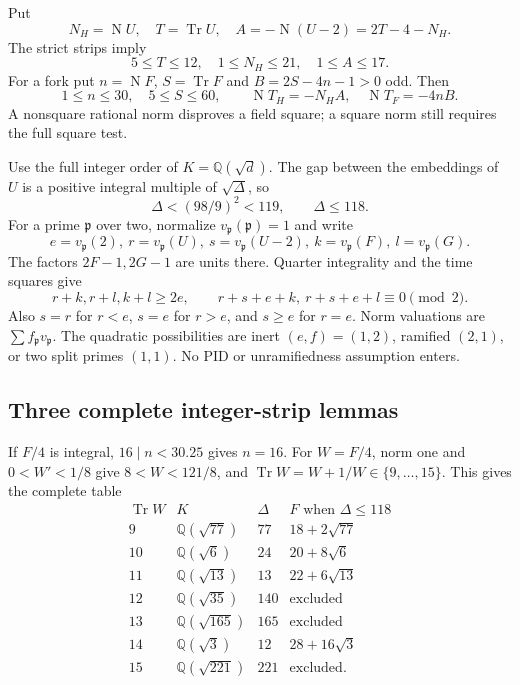 \documentclass[11pt]{article}
\newcommand{\QQ}{\mathbb Q}
\newcommand{\Tr}{\operatorname{Tr}}
\newcommand{\N}{\operatorname{N}}
\begin{document}
Put
\[
 N_H=\N U,\quad T=\Tr U,\quad A=-\N(U-2)=2T-4-N_H.
\]
The strict strips imply
\[
 5\le T\le12,\quad1\le N_H\le21,\quad1\le A\le17.
\]
For a fork put $n=\N F$, $S=\Tr F$ and
$B=2S-4n-1>0$ odd. Then
\begin{equation}\label{eq:tnorm}
 1\le n\le30,\quad5\le S\le60,\qquad
 \N T_H=-N_HA,\quad\N T_F=-4nB.
\end{equation}
A nonsquare rational norm disproves a field square; a square norm
still requires the full square test.

Use the full integer order of $K=\QQ(\sqrt d)$.
The gap between the embeddings of $U$ is a positive integral
multiple of $\sqrt\Delta$, so
\begin{equation}\label{eq:disc118}
 \Delta<(98/9)^2<119,\qquad\Delta\le118.
\end{equation}
For a prime $\mathfrak p$ over two, normalize
$v_{\mathfrak p}(\mathfrak p)=1$ and write
\[
 e=v_{\mathfrak p}(2),\ r=v_{\mathfrak p}(U),\
 s=v_{\mathfrak p}(U-2),\
 k=v_{\mathfrak p}(F),\ l=v_{\mathfrak p}(G).
\]
The factors $2F-1,2G-1$ are units there. Quarter integrality and
the time squares give
\begin{equation}\label{eq:valuation}
 r+k,r+l,k+l\ge2e,\qquad
 r+s+e+k,\ r+s+e+l\equiv0\pmod2.
\end{equation}
Also $s=r$ for $r<e$, $s=e$ for $r>e$, and $s\ge e$ for
$r=e$. Norm valuations are $\sum f_{\mathfrak p}v_{\mathfrak p}$.
The quadratic possibilities are inert $(e,f)=(1,2)$, ramified
$(2,1)$, or two split primes $(1,1)$. No PID or unramifiedness
assumption enters.

\subsection{Three complete integer-strip lemmas}

If $F/4$ is integral, $16\mid n<30.25$ gives $n=16$.
For $W=F/4$, norm one and $0<W'<1/8$ give
$8<W<121/8$, and $\Tr W=W+1/W\in\{9,\ldots,15\}$.
This gives the complete table
\[
\begin{array}{c|c|r|l}
\Tr W&K&\Delta&F\text{ when }\Delta\le118\\\hline
9&\QQ(\sqrt{77})&77&18+2\sqrt{77}\\
10&\QQ(\sqrt6)&24&20+8\sqrt6\\
11&\QQ(\sqrt{13})&13&22+6\sqrt{13}\\
12&\QQ(\sqrt{35})&140&\text{excluded}\\
13&\QQ(\sqrt{165})&165&\text{excluded}\\
14&\QQ(\sqrt3)&12&28+16\sqrt3\\
15&\QQ(\sqrt{221})&221&\text{excluded}.
\end{array}
\]
\end{document}
